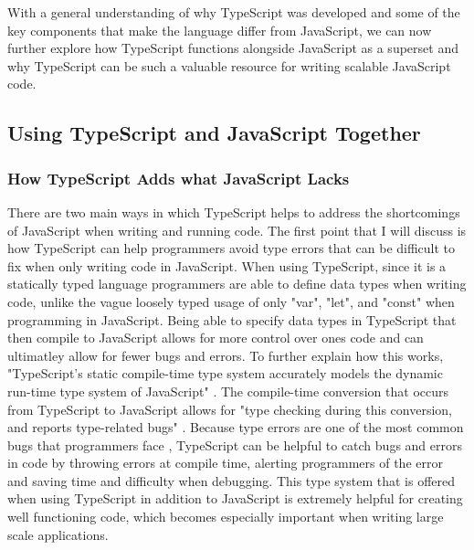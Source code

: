 \documentclass{article}
\theoremstyle{theorem}
\theoremstyle{definition}
\theoremstyle{remark}
\begin{document}
With a general understanding of why TypeScript was developed and some of the key components that make the language differ from JavaScript, we can now further explore how TypeScript functions alongside JavaScript as a superset and why TypeScript can be such a valuable resource for writing scalable JavaScript code.


\subsection{Using TypeScript and JavaScript Together}

\subsubsection{How TypeScript Adds what JavaScript Lacks}

There are two main ways in which TypeScript helps to address the shortcomings of JavaScript when writing and running code. The first point that I will discuss is how TypeScript can help programmers avoid type errors that can be difficult to fix when only writing code in JavaScript. When using TypeScript, since it is a statically typed language programmers are able to define data types when writing code, unlike the vague loosely typed usage of only "var", "let", and "const" when programming in JavaScript. Being able to specify data types in TypeScript that then compile to JavaScript allows for more control over ones code and can ultimatley allow for fewer bugs and errors. To further explain how this works, "TypeScript's static compile-time type system accurately models the dynamic run-time type system of JavaScript" \cite{13}. The compile-time conversion that occurs from TypeScript to JavaScript allows for "type checking during this conversion, and reports type-related bugs" \cite{15}. Because type errors are one of the most common bugs that programmers face \cite{11}, TypeScript can be helpful to catch bugs and errors in code by throwing errors at compile time, alerting programmers of the error and saving time and difficulty when debugging. This type system that is offered when using TypeScript in addition to JavaScript is extremely helpful for creating well functioning code, which becomes especially important when writing large scale applications.
\end{document}
